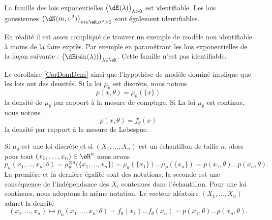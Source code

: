 \begin{example}
    La famille des lois exponentielles \( \big( \dE(\lambda) \big)_{\lambda>0}\) est identifiable. Les lois gaussiennes \( \big( \dN(m,\sigma^2) \big)_{m\in\eR,\sigma^2>0}\) sont également identifiables.

    En réalité il est assez compliqué de trouver un exemple de modèle non identifiable à moins de la faire exprès. Par exemple en paramétrant les lois exponentielles de la façon suivante : \( \big( \dE(\sin(\lambda)) \big)_{\lambda\in\eR}\). Cette famille n'est pas identifiable.
\end{example}

Le corollaire \ref{CorDomDens} ainsi que l'hypothèse de modèle dominé implique que les lois ont des densités. Si la loi \( \mu_{\theta}\) est discrète, nous notons 
\begin{equation}
    p(x,\theta)=\mu_{\theta}(\{ x \})
\end{equation}
la densité de \( \mu_{\theta}\) par rapport à la mesure de comptage. Si La loi \( \mu_{\theta}\) est continue, nous notons
\begin{equation}
    p(x,\theta)=f_{\theta}(x)
\end{equation}
la densité par rapport à la mesure de Lebesgue.

Si \( \mu_{\theta}\) est une loi discrète et si \( (X_1,\ldots,X_n)\) est un échantillon de taille \( n\), alors pour tout \( (x_1,\ldots,x_n)\in\eR^n\) nous avons
\begin{equation}
    p_n(x_1,\ldots,x_n;\theta)=\mu_{\theta}^{\otimes n}\big( \{ x_1,\ldots,x_n \} \big)=\mu_{\theta}(\{ x_1 \})\ldots\mu_{\theta}(\{ x_n \})=p(x_1,\theta)\ldots p(x_n,\theta).
\end{equation}
La première et la dernière égalité sont des notations; la seconde est une conséquence de l'indépendance des \( X_i\) contenues dans l'échantillon. Pour une loi continues, nous adoptons la même notation. Le vecteur aléatoire \( (X_1,\ldots,X_n)\) admet la densité
\begin{equation}
    (x_1,\ldots,x_n)\mapsto p_n(x_1,\ldots,x_n;\theta)=f_{\theta}(x_1)\ldots f_{\theta}(x_n)=p(x_1,\theta)\ldots p(x_n,\theta).
\end{equation}

